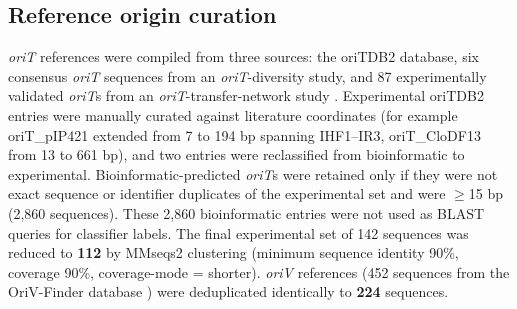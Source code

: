 %

\subsection*{Reference origin curation}

\emph{oriT} references were compiled from three sources: the oriTDB2 \cite{liu2025oritdb} database, six consensus \emph{oriT} sequences from an \emph{oriT}-diversity
study,
and 87 experimentally validated \emph{oriT}s from an
\emph{oriT}-transfer-network study \cite{aresarroyo2023origins}.
Experimental oriTDB2 entries were manually curated against literature
coordinates (for example oriT\_pIP421 extended from 7 to 194 bp spanning
IHF1--IR3, oriT\_CloDF13 from 13 to 661 bp), and two entries were
reclassified from bioinformatic to experimental. Bioinformatic-predicted
\emph{oriT}s were retained only if they were not exact sequence or identifier
duplicates of the experimental set and were $\geq$15 bp (2,860 sequences).
These 2,860 bioinformatic entries were not used as BLAST queries for
classifier labels. The final experimental set of 142 sequences was reduced to
\textbf{112} by MMseqs2 \cite{steinegger2017mmseqs2} clustering (minimum sequence identity 90\%, coverage 90\%, coverage-mode =
shorter). \emph{oriV} references (452 sequences from the OriV-Finder
database \cite{li2025orivfinder}) were deduplicated identically to \textbf{224} sequences.

